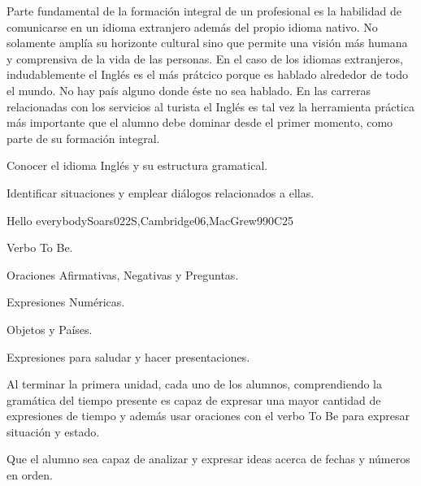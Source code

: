 \begin{syllabus}


\begin{justification}
Parte fundamental de la formación integral de un profesional es la habilidad de comunicarse en un idioma extranjero además del propio idioma nativo. No solamente amplí­a su horizonte cultural sino que permite una visión más humana y comprensiva de la vida de las personas. En el caso de los idiomas extranjeros, indudablemente el Inglés es el más prátcico porque es hablado alrededor de todo el mundo. No hay paí­s alguno donde éste no sea hablado. En las carreras relacionadas con los servicios al turista el Inglés es tal vez la herramienta práctica más importante que el alumno debe dominar desde el primer momento, como parte de su formación integral.
\end{justification}

\begin{goals}
\item Conocer el idioma Inglés y su estructura gramatical.
\item Identificar situaciones y emplear diálogos relacionados a ellas.
\end{goals}

\begin{outcomes}
\item {}
\end{outcomes}

\begin{competences}
    \item {}
\end{competences}

\begin{unit}{Hello everybody}{}{Soars022S,Cambridge06,MacGrew99}{0}{C25}
   \begin{topics}
      \item Verbo To Be.
      \item Oraciones Afirmativas, Negativas y Preguntas.
      \item Expresiones Numéricas.
      \item Objetos y Paí­ses.
      \item Expresiones para saludar y hacer presentaciones.
   \end{topics}

   \begin{learningoutcomes}
      \item Al terminar la primera unidad, cada uno de los alumnos, comprendiendo la gramática del tiempo presente es capaz de expresar una mayor cantidad de expresiones de tiempo y además usar oraciones con el verbo To Be para expresar situación y estado. 
      \item Que el alumno sea capaz de analizar y expresar ideas acerca de fechas y números en orden. 
   \end{learningoutcomes}
\end{unit}


\end{syllabus}
